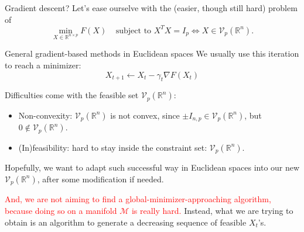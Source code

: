 \documentclass[aspectratio=43, 10pt]{beamer}
\begin{document}
  \begin{frame}[t]{Gradient descent?}
    \vspace{-0.8em}
     Let's ease ourselve with the (easier, though still hard) problem of $$\min_{X \in \mathbb{R}^{n \times p}} F(X) ~~~~~ \text{subject to   } X^T X = I_p \iff X \in \mathcal{V}_{p}(\mathbb{R}^n).$$

      \vspace{-0.5cm}
      \begin{block}{General gradient-based methods in Euclidean spaces}
          We usually use this iteration to reach a minimizer: 
          $$X_{t+1} \gets X_t - \gamma_t \nabla F(X_t)$$
      \end{block}

     \pause 
     \vspace{0.2cm}
     Difficulties come with the feasible set $\mathcal{V}_p(\mathbb{R}^n)$: 
     \begin{itemize}
         \item Non-convexity: $\mathcal{V}_{p}(\mathbb{R}^n)$ is not convex, since $\pm I_{n,p} \in \mathcal{V}_{p}(\mathbb{R}^n)$, but $0 \notin \mathcal{V}_{p}(\mathbb{R}^n).$
         \item (In)feasibility: hard to stay inside the constraint set: $\mathcal{V}_{p}(\mathbb{R}^n)$. 
     \end{itemize}

     Hopefully, we want to adapt such successful way in Euclidean spaces into our new $\mathcal{V}_p(\mathbb{R}^n)$, after some modification if needed. 

     \vspace{0.1cm}
     \textcolor{red}{And, we are not aiming to find a global-minimizer-approaching algorithm, because doing so on a manifold $\mathcal{M}$ is really hard.} Instead, what we are trying to obtain is an algorithm to generate a decreasing sequence of feasible $X_t$'s.
  \end{frame}
\end{document}
